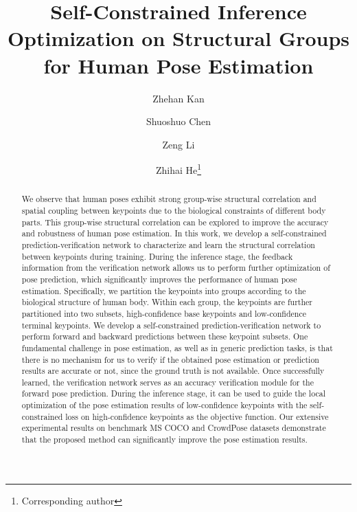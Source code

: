 \documentclass[runningheads]{llncs}
\begin{document}
\sloppy
\pagestyle{headings}
\mainmatter
\def\ECCVSubNumber{3985}  

\title{Self-Constrained Inference Optimization on  Structural Groups  for Human Pose Estimation} 

\begin{comment}
\titlerunning{ECCV-22 submission ID \ECCVSubNumber} 
\authorrunning{ECCV-22 submission ID \ECCVSubNumber} 
\author{Anonymous ECCV submission}
\institute{Paper ID \ECCVSubNumber}
\end{comment}


\author{Zhehan Kan\and
Shuoshuo Chen\and
Zeng Li
\and
Zhihai He\thanks{Corresponding author}}
\maketitle

\begin{abstract}
We observe that human poses exhibit strong group-wise structural correlation and spatial coupling between keypoints due to the biological constraints of different body parts. 
This group-wise structural correlation can be explored to improve the accuracy and robustness of human pose estimation. 
In this work, we develop a self-constrained  prediction-verification network to characterize and learn the structural correlation between keypoints during training. During the inference stage, the feedback information from the verification network allows us to perform further optimization of pose prediction, which significantly improves the performance of human pose estimation.
Specifically, we partition the keypoints into groups according to the biological structure of human body. Within each group, the keypoints are further partitioned into two subsets, high-confidence base keypoints and low-confidence terminal keypoints. We develop a self-constrained prediction-verification network  to perform forward and backward predictions between these keypoint subsets. 
One fundamental challenge in pose estimation, as well as in generic prediction tasks, is that there is no mechanism for us to verify if the obtained pose estimation or prediction results are accurate or not, since the ground truth is not available. 
Once successfully learned, the verification network serves as an accuracy  verification module for the forward pose prediction. During the inference stage, it can  be used to guide the local optimization of the pose estimation results of low-confidence keypoints with the self-constrained loss on high-confidence keypoints as the objective function. Our extensive experimental results on benchmark MS COCO and CrowdPose datasets demonstrate that the proposed method can significantly improve the pose estimation results. 
\end{abstract}
\end{document}
